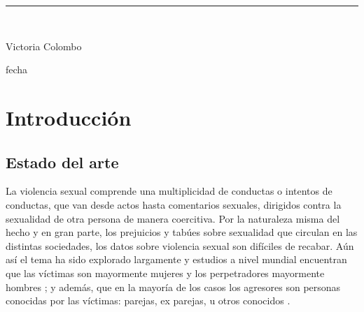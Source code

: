 \documentclass[10 pt]{article}
\begin{document}
\begin{titlepage}
\begin{center}
    
    \vspace*{0.3in}
    \rule{80mm}{0.1mm}\\
    \vspace*{0.1in}
    \begin{large}
    Victoria Colombo
    
    \vspace*{0.3in}
    
    \vspace*{0.1in}fecha
    \end{large}
    \end{center}
    
    \end{titlepage}

\newpage

\begin{abstract}

\end{abstract}
\newpage
\section*{Introducción}\label{intro}

\subsection*{Estado del arte}

La violencia sexual comprende una multiplicidad de conductas o intentos de conductas, que van desde actos hasta comentarios sexuales, dirigidos contra la sexualidad de otra persona de manera coercitiva. Por la naturaleza misma del hecho y en gran parte, los prejuicios y tabúes sobre sexualidad que circulan en las distintas sociedades, los datos sobre violencia sexual son difíciles de recabar. Aún así el tema ha sido explorado largamente y estudios a nivel mundial encuentran que las víctimas son mayormente mujeres y los perpetradores mayormente hombres \citetext{\citealp[p.~149]{ferris2002world}; \citealp[p.~15]{contreras2016violencia}}; y además, que en la mayoría de los casos los agresores son personas conocidas por las víctimas: parejas, ex parejas, u otros conocidos \citep*{garcia2005multi, contreras2016violencia,unicef2018analisis}.
\end{document}

